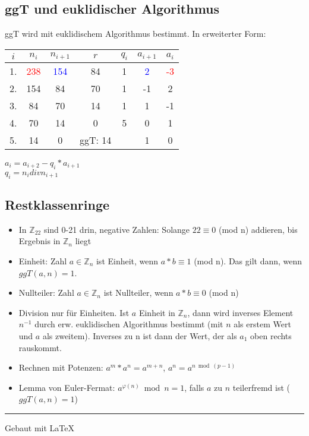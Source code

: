 \documentclass[12pt,landscape]{article}
\begin{document}
\begin{multicols}{3}
\subsection{ggT und euklidischer Algorithmus}
ggT wird mit euklidischem Algorithmus bestimmt. In erweiterter Form:
\vspace*{0.5cm}\newline
\begin{tabular}{|c|c|c|c|c|c|c|}
\hline \rule[-2ex]{0pt}{5.5ex} $i$ & $n_i$ & $n_{i+1}$ &  $r$ & $q_i$ & $a_{i+1}$ & $a{_i}$ \\ 
\hline \rule[-2ex]{0pt}{5.5ex} 1. & \textcolor{red}{238} & \textcolor{blue}{154} & 84 & 1 & \textcolor{blue}{2} & \textcolor{red}{-3} \\ 
\hline \rule[-2ex]{0pt}{5.5ex} 2. & 154 &  84 & 70 & 1 & -1 & 2 \\ 
\hline \rule[-2ex]{0pt}{5.5ex} 3. & 84 & 70 & 14 & 1 & 1 & -1 \\ 
\hline \rule[-2ex]{0pt}{5.5ex} 4. & 70 & 14 & 0 & 5 & 0 & 1 \\ 
\hline \rule[-2ex]{0pt}{5.5ex} 5. & 14 & 0 & ggT: 14 &  & 1 & 0 \\ 
\hline 
\end{tabular}
\vspace{0.5cm}\newline
$a_i = a_{i+2} - q_i * a_{i+1}$\\
$q_i = n_i div n_{i+1}$
\subsection{Restklassenringe}
\begin{itemize}
\item In $\mathbb{Z}_{22}$ sind 0-21 drin, negative Zahlen: Solange $22 \equiv 0$ (mod n) addieren, bis Ergebnis in $\mathbb{Z}_{n}$ liegt
\item Einheit: Zahl $a \in \mathbb{Z}_{n}$ ist Einheit, wenn $a * b \equiv 1$ (mod n). Das gilt dann, wenn $ggT(a, n) = 1$.
\item Nullteiler: Zahl $a \in \mathbb{Z}_{n}$ ist Nullteiler, wenn $a * b \equiv 0$ (mod n)
\item Division nur für Einheiten. Ist $a$ Einheit in $\mathbb{Z}_{n}$, dann wird inverses Element $n^{-1}$ durch erw. euklidischen Algorithmus bestimmt (mit $n$ als erstem Wert und $a$ als zweitem). Inverses zu n ist dann der Wert, der als $a_1$ oben rechts rauskommt.
\item Rechnen mit Potenzen: $a^m * a^n = a^{m+n}$, $a^n=a^{n \bmod (p-1)}$ 
\item Lemma von Euler-Fermat: $a^{\varphi(n)} \bmod n = 1$, falls $a$ zu $n$ teilerfremd ist ($ggT(a, n)=1$)
\end{itemize}

\rule{0.3\linewidth}{0.25pt}
\scriptsize

Gebaut mit \LaTeX

\end{multicols}
\end{document}
